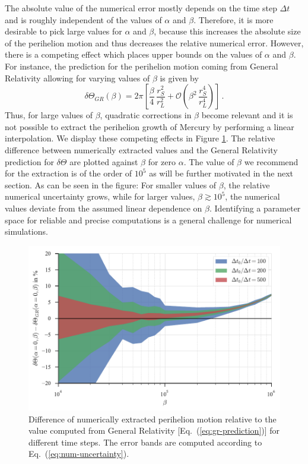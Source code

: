 \documentclass[12pt,ngerman,american]{iopart}
\begin{document}
The absolute value of the numerical error mostly depends on the time step $\Delta t$ and is roughly independent of the values of $\alpha$ and $\beta$.
Therefore, it is more desirable to pick large values for $\alpha$ and $\beta$, because this increases the absolute size of the perihelion
motion and thus decreases the relative numerical error.
However, there is a competing effect which places upper bounds on the values of $\alpha$ and $\beta$.
For instance, the prediction for the perihelion motion coming from General Relativity allowing for varying values of $\beta$ is given by
\begin{equation}\label{eq:gr-prediction}
	\delta \Theta_{GR} (\beta) = 
	2 \pi \left[
	\frac{\beta}{4} \,\frac{r_S^2}{r_L^2}
	+\mathcal{O}\left(\beta^2\,\frac{r_S^4}{r_L^4}\right)
	\right]
	\, .
\end{equation}
Thus, for large values of $\beta$, quadratic corrections in $\beta$ become relevant and it is not possible to extract the 
perihelion growth of Mercury by performing a linear interpolation.
We display these competing effects in Figure \ref{fcc4}.
The relative difference between numerically extracted values and the General Relativity prediction for $\delta \Theta$ are plotted against $\beta$ for zero $\alpha$.
The value of $\beta$ we recommend for the extraction is of the order of $10^5$ as will be further motivated in the next section.
As can be seen in the figure: For smaller values of $\beta$, the relative numerical uncertainty grows, while for larger 
 values, $\beta \gtrsim 10^5$, the numerical values deviate from the assumed linear dependence on $\beta$.
Identifying a parameter space for reliable and precise computations is a general challenge for numerical simulations.
\begin{figure}[htb]
	\centering
	\includegraphics[width=.99\textwidth]{figs/computation-precision.pdf}
	\caption{\label{fcc4}Difference of numerically extracted perihelion motion relative to the value computed from General Relativity [Eq.~(\ref{eq:gr-prediction})] for different time steps.  The error bands are computed according to Eq.~(\ref{eq:num-uncertainty}).
}
\end{figure}
\end{document}
